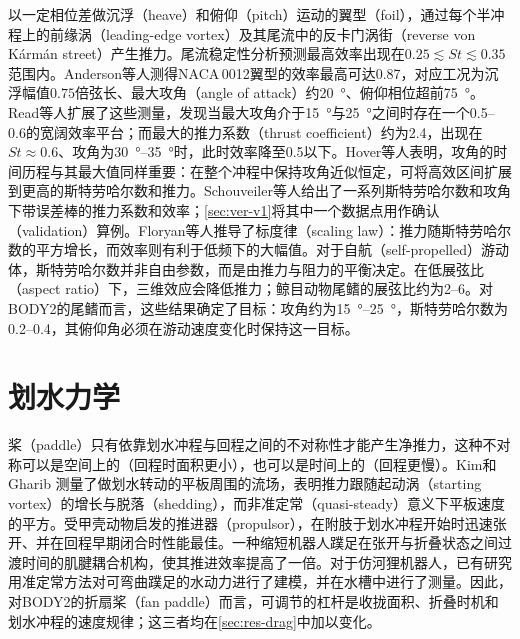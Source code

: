 以一定相位差做沉浮（heave）和俯仰（pitch）运动的翼型（foil），通过每个半冲程上的前缘涡（leading-edge vortex）及其尾流中的反卡门涡街（reverse von K\'arm\'an street）产生推力\cite{Triantafyllou1991}。尾流稳定性分析预测最高效率出现在$0.25\lesssim\mathit{St}\lesssim0.35$范围内\cite{Triantafyllou1991}。Anderson等人\cite{Anderson1998}测得NACA\,0012翼型的效率最高可达0.87，对应工况为沉浮幅值$0.75$倍弦长、最大攻角（angle of attack）约\SI{20}{\degree}、俯仰相位超前\SI{75}{\degree}。Read等人\cite{Read2003}扩展了这些测量，发现当最大攻角介于\SI{15}{\degree}与\SI{25}{\degree}之间时存在一个0.5--0.6的宽阔效率平台；而最大的推力系数（thrust coefficient）约为2.4，出现在$\mathit{St}\approx0.6$、攻角为\SIrange{30}{35}{\degree}时，此时效率降至0.5以下。Hover等人\cite{Hover2004}表明，攻角的时间历程与其最大值同样重要：在整个冲程中保持攻角近似恒定，可将高效区间扩展到更高的斯特劳哈尔数和推力。Schouveiler等人\cite{Schouveiler2005}给出了一系列斯特劳哈尔数和攻角下带误差棒的推力系数和效率；\cref{sec:ver-v1}将其中一个数据点用作确认（validation）算例。Floryan等人\cite{Floryan2017}推导了标度律（scaling law）：推力随斯特劳哈尔数的平方增长，而效率则有利于低频下的大幅值。对于自航（self-propelled）游动体，斯特劳哈尔数并非自由参数，而是由推力与阻力的平衡决定\cite{Eloy2012}。在低展弦比（aspect ratio）下，三维效应会降低推力；鲸目动物尾鳍的展弦比约为2--6\cite{Ayancik2020}。对BODY2的尾鳍而言，这些结果确定了目标：攻角约为\SIrange{15}{25}{\degree}，斯特劳哈尔数为0.2--0.4，其俯仰角必须在游动速度变化时保持这一目标。

\section{划水力学}
\label{sec:rw-paddle}

桨（paddle）只有依靠划水冲程与回程之间的不对称性才能产生净推力，这种不对称可以是空间上的（回程时面积更小），也可以是时间上的（回程更慢）\cite{HerreraAmaya2024}。Kim和Gharib \cite{Kim2011}测量了做划水转动的平板周围的流场，表明推力跟随起动涡（starting vortex）的增长与脱落（shedding），而非准定常（quasi-steady）意义下平板速度的平方。受甲壳动物启发的推进器（propulsor），在附肢于划水冲程开始时迅速张开、并在回程早期闭合时性能最佳\cite{Santos2026}。一种缩短机器人蹼足在张开与折叠状态之间过渡时间的肌腱耦合机构，使其推进效率提高了一倍\cite{Lin2024}。对于仿河狸机器人，已有研究用准定常方法对可弯曲蹼足的水动力进行了建模，并在水槽中进行了测量\cite{Chen2021,Chen2022}。因此，对BODY2的折扇桨（fan paddle）而言，可调节的杠杆是收拢面积、折叠时机和划水冲程的速度规律；这三者均在\cref{sec:res-drag}中加以变化。

